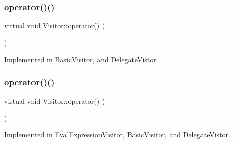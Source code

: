 \mbox{\label{struct_visitor_af3b394eaf1b9b1db22379aedcb234a2f}} 
\subsubsection{\texorpdfstring{operator()()}{operator()()}\hspace{0.1cm}{\footnotesize\ttfamily [4/60]}}
{\footnotesize\ttfamily virtual void Visitor\+::operator() (\begin{DoxyParamCaption}\item[{const \hyperlink{struct_boolean_literal}{Boolean\+Literal} \&}]{ }\end{DoxyParamCaption})\hspace{0.3cm}{\ttfamily [pure virtual]}}



Implemented in \hyperlink{struct_basic_visitor_a2971ac256de1c7b0206b44f888d9abd5}{Basic\+Visitor}, and \hyperlink{struct_delegate_vistor_a5b0414c4f00fd368ce65ae03f44ad5a0}{Delegate\+Vistor}.

\mbox{\label{struct_visitor_a6d707fe0c1563b39aae3ecd7ddb5ab8f}} 
\subsubsection{\texorpdfstring{operator()()}{operator()()}\hspace{0.1cm}{\footnotesize\ttfamily [5/60]}}
{\footnotesize\ttfamily virtual void Visitor\+::operator() (\begin{DoxyParamCaption}\item[{const \hyperlink{struct_numeric_literal}{Numeric\+Literal} \&}]{ }\end{DoxyParamCaption})\hspace{0.3cm}{\ttfamily [pure virtual]}}



Implemented in \hyperlink{struct_eval_expression_visitor_a4eb471ad8286c264eb2af55aaf6c5a45}{Eval\+Expression\+Visitor}, \hyperlink{struct_basic_visitor_a177e744fc03783b7fbb83d3292a7c029}{Basic\+Visitor}, and \hyperlink{struct_delegate_vistor_a7447ce0cf89a2cce50016f1e6be2e427}{Delegate\+Vistor}.

\mbox{\label{struct_visitor_a6bab8ba66edf0cc73cb92073269e7848}} 
